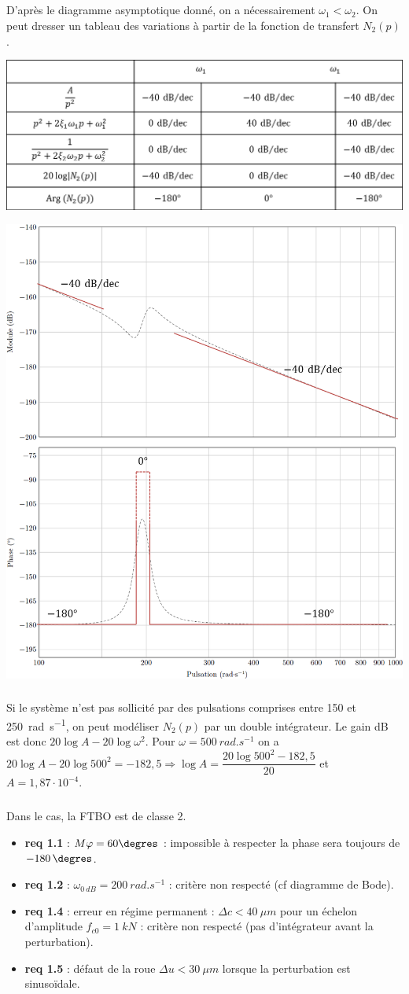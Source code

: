 \documentclass[10pt,fleqn]{article} %
\begin{document}
\subparagraph{}
D'après le diagramme asymptotique donné, on a nécessairement $\omega_1<\omega_2$. On peut dresser un tableau des variations à partir de la fonction de transfert $N_2(p)$. 
\begin{center}
\includegraphics[width=.7\linewidth]{images/fig_06}

\includegraphics[width=.7\linewidth]{images/fig_07}
\end{center}

\subparagraph{}
Si le système n'est pas sollicité par des pulsations comprises entre 150 et \SI{250}{rad.s^{-1}}, on peut modéliser $N_2(p)$ par un double intégrateur. 
Le gain dB est donc  $20\log A - 20 \log \omega^2$.  Pour $\omega=\SI{500}{rad.s^{-1}}$ on a $20\log A - 20 \log 500^2=-182,5 \Rightarrow \log A = \dfrac{20 \log 500^2-182,5}{20}$ et $A=1,87\cdot 10^{-4}$.


\subparagraph{}

Dans le cas, la FTBO est de classe 2.
\begin{itemize}
\item \textbf{req 1.1} : $M\varphi = 60\degres$ : impossible à respecter la phase sera toujours de $\SI{-180}{\degres}$.
\item \textbf{req 1.2} : $\omega_{\SI{0}{dB}}=\SI{200}{rad.s^{-1}}$ : critère non respecté (cf diagramme de Bode).
\item \textbf{req 1.4} : erreur en régime permanent : $\Delta c < \SI{40}{\mu m}$ pour un échelon d'amplitude $f_{c0}=\SI{1}{kN}$ : critère non respecté (pas d'intégrateur avant la perturbation).
\item \textbf{req 1.5} : défaut de la roue $\Delta u < \SI{30}{\mu m}$ lorsque la perturbation est sinusoïdale.
\end{itemize}
\end{document}

